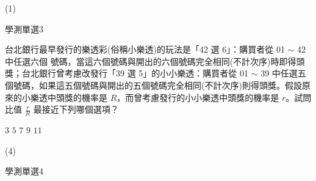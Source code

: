 \begin{QUESTIONS}
\begin{QUESTION}
        \begin{QANS}
            (1)
        \end{QANS}
        \begin{QSOLLIST}
        \end{QSOLLIST}
        \begin{QEMPTYSPACE}
        \end{QEMPTYSPACE}
    \end{QUESTION}
    \begin{QUESTION}
        \begin{ExamInfo}{94}{學測}{單選}{3}
        \end{ExamInfo}
        \begin{ExamAnsRateInfo}{52}{82}{54}{20}
        \end{ExamAnsRateInfo}
        \begin{QBODY}
            台北銀行最早發行的樂透彩(俗稱小樂透)的玩法是「42 選 6」：購買者從 01 $\sim$ 42 中任選六個 號碼，當這六個號碼與開出的六個號碼完全相同(不計次序)時即得頭獎；台北銀行曾考慮改發行「39 選 5」的小小樂透：購買者從 01 $\sim$ 39 中任選五個號碼，如果這五個號碼與開出的五個號碼完全相同(不計次序)則得頭獎。假設原來的小樂透中頭獎的機率是 $R$，而曾考慮發行的小小樂透中頭獎的機率是 $r$。試問比值 $\frac{r}{R}$ 最接近下列哪個選項？
			\begin{QOPS}
				\QOP $3$
				\QOP $5$
				\QOP $7$
				\QOP $9$
				\QOP $11$
			\end{QOPS}
        \end{QBODY}
        \begin{QFROMS}
        \end{QFROMS}
        \begin{QTAGS}\end{QTAGS}
        \begin{QANS}
            (4)
        \end{QANS}
        \begin{QSOLLIST}
        \end{QSOLLIST}
        \begin{QEMPTYSPACE}
        \end{QEMPTYSPACE}
    \end{QUESTION}
    \begin{QUESTION}
        \begin{ExamInfo}{94}{學測}{單選}{4}
        \end{ExamInfo}
        \begin{ExamAnsRateInfo}{32}{65}{21}{10}
        \end{ExamAnsRateInfo}

\end{QUESTION}
\end{QUESTIONS}
